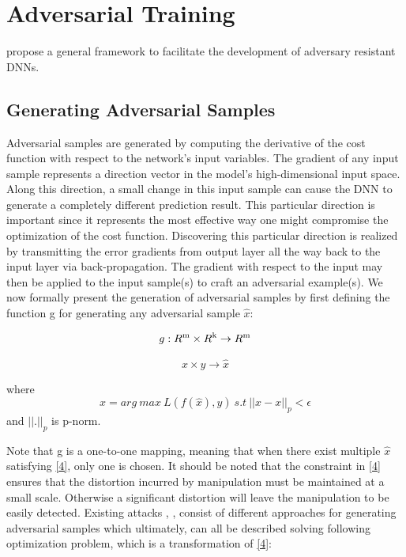 \documentclass[a4paper]{article}
\begin{document}
\section{Adversarial Training}\label{training}
\cite{wang2016learning} propose a general framework to facilitate the development of adversary resistant DNNs.

	
\subsection{Generating Adversarial Samples}
Adversarial samples are generated by computing the derivative of the cost function with respect to the network’s input variables. The gradient of any input sample represents a direction vector in the model’s high-dimensional input space. Along this direction, a small change in this input sample can cause the DNN to generate a completely different prediction result. This particular direction is important since it represents the most effective way one might compromise the optimization of the cost function. Discovering this particular direction is realized by transmitting the error gradients from output layer all the way back to the input layer via back-propagation. The gradient with respect to the input may then be applied to the input sample(s) to craft an adversarial example(s). We now formally present the generation of adversarial samples by first defining the function g for generating any adversarial sample $\hat{x}$:

\begin{equation}
g : R\textsuperscript{m} \times R\textsuperscript{k} \rightarrow R\textsuperscript{m}
\end{equation}

\begin{equation*}
x \times y \rightarrow \hat{x}
\end{equation*}

where
\begin{equation}\label{4}
\hat{x} = arg \ max \ L(f(\hat{x}), y) \ s.t \ ||\hat{x}-x||_p < \epsilon
\end{equation} and $||.||_p$ is p-norm.
	
Note that g is a one-to-one mapping, meaning that when there exist multiple $\hat{x}$ satisfying \eqref{4}, only one is chosen. It should be noted that the constraint in \eqref{4} ensures that the distortion incurred by manipulation must be maintained at a small scale. Otherwise a significant distortion will leave the manipulation to be easily detected. Existing attacks \cite{carlini2017towards}, \cite{szegedy2013intriguing}, \cite{papernot2016limitations} consist of different approaches for generating adversarial samples which ultimately, can all be described solving following optimization problem, which is a transformation of \eqref{4}:
\end{document}
